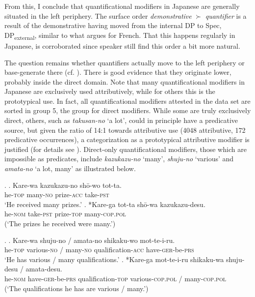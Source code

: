 \documentclass [output=book,colorlinks,citecolor=brown]{langscibook}
\begin{document}
From this, I conclude that quantificational modifiers in Japanese are generally situated in the left periphery. The surface order \textit{demonstrative} $\succ$ \textit{quantifier} is a result of the demonstrative having moved from the internal DP to Spec, DP\textsubscript{external}, similar to what \citet{laenzlinger:2005:french, laenzlinger:2011:elements} argues for French. That this happens regularly in Japanese, is corroborated since speaker still find this order a bit more natural.

The question remains whether quantifiers actually move to the left periphery or base-generate there (cf. \citealt{kim:2019:syntax}). There is good evidence that they originate lower, probably inside the direct domain. Note that many quantificational modifiers in Japanese are exclusively used attributively, while for others this is the prototypical use. In fact, all quantificational modifiers attested in the data set are sorted in group 5, the group for direct modifiers. While some are truly exclusively direct, others, such as \textit{takusan-no} `a lot’, could in principle have a predicative source, but given the ratio of 14:1 towards attributive use (4048 attributive, 172 predicative occurrences), a categorization as a prototypical attributive modifier is justified (for details see \citealt{kohlich:2023:suppl}). Direct-only quantificational modifiers, those which are impossible as predicates, include \textit{kazukazu-no} `many’, \textit{shuju-no} `various’ and \textit{amata-no} `a lot, many’ as illustrated below.

\ex. \ag. Kare-wa kazukazu-no shō-wo tot-ta.\\
he-\textsc{top} many-\textsc{no} prize-\textsc{acc} take-\textsc{pst}\\
`He received many prizes.’
\bg. *Kare-ga tot-ta shō-wa kazukazu-desu.\\
he-\textsc{nom} take-\textsc{pst} prize-\textsc{top} many-\textsc{cop.pol}\\
(`The prizes he received were many.’)


\ex. \ag. Kare-wa shuju-no / amata-no shikaku-wo mot-te-i-ru.\\
he-\textsc{top} various-\textsc{no} / many-\textsc{no} qualification-\textsc{acc} have-\textsc{ger}-be-\textsc{prs}\\
`He has various / many qualifications.’
\bg. *Kare-ga mot-te-i-ru shikaku-wa shuju-desu / amata-desu.\\
he-\textsc{nom} have-\textsc{ger}-be-\textsc{prs} qualification-\textsc{top} various-\textsc{cop.pol} / many-\textsc{cop.pol}\\
(`The qualifications he has are various / many.’)
\end{document}
